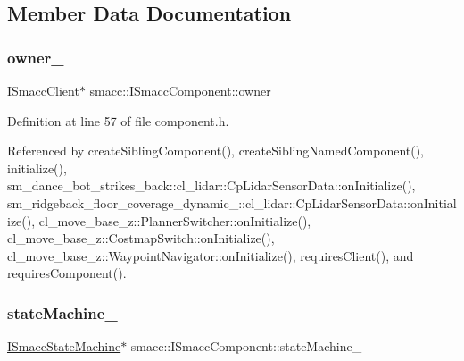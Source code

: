 \subsection{Member Data Documentation}
\mbox{\label{classsmacc_1_1ISmaccComponent_a909590e672450ce0eb0d8facb45c737a}} 
\subsubsection{\texorpdfstring{owner\+\_\+}{owner\_}}
{\footnotesize\ttfamily \hyperlink{classsmacc_1_1ISmaccClient}{I\+Smacc\+Client}$\ast$ smacc\+::\+I\+Smacc\+Component\+::owner\+\_\+\hspace{0.3cm}{\ttfamily [protected]}}



Definition at line 57 of file component.\+h.



Referenced by create\+Sibling\+Component(), create\+Sibling\+Named\+Component(), initialize(), sm\+\_\+dance\+\_\+bot\+\_\+strikes\+\_\+back\+::cl\+\_\+lidar\+::\+Cp\+Lidar\+Sensor\+Data\+::on\+Initialize(), sm\+\_\+ridgeback\+\_\+floor\+\_\+coverage\+\_\+dynamic\+\_\+::cl\+\_\+lidar\+::\+Cp\+Lidar\+Sensor\+Data\+::on\+Initialize(), cl\+\_\+move\+\_\+base\+\_\+z\+::\+Planner\+Switcher\+::on\+Initialize(), cl\+\_\+move\+\_\+base\+\_\+z\+::\+Costmap\+Switch\+::on\+Initialize(), cl\+\_\+move\+\_\+base\+\_\+z\+::\+Waypoint\+Navigator\+::on\+Initialize(), requires\+Client(), and requires\+Component().

\mbox{\label{classsmacc_1_1ISmaccComponent_ae3f37acc1679f79299b86872d4b1f80f}} 
\subsubsection{\texorpdfstring{state\+Machine\+\_\+}{stateMachine\_}}
{\footnotesize\ttfamily \hyperlink{classsmacc_1_1ISmaccStateMachine}{I\+Smacc\+State\+Machine}$\ast$ smacc\+::\+I\+Smacc\+Component\+::state\+Machine\+\_\+\hspace{0.3cm}{\ttfamily [protected]}}



